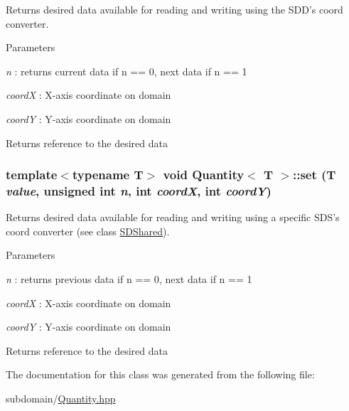 Returns desired data available for reading and writing using the SDD's coord converter. 
\begin{DoxyParams}{Parameters}
\item[{\em n}]: returns current data if n == 0, next data if n == 1 \item[{\em coordX}]: X-\/axis coordinate on domain \item[{\em coordY}]: Y-\/axis coordinate on domain\end{DoxyParams}
\begin{DoxyReturn}{Returns}
reference to the desired data 
\end{DoxyReturn}
\hypertarget{classQuantity_a10c68498d1dfe59535a6f07c0627c8d4}{
\subsubsection[{set}]{\setlength{\rightskip}{0pt plus 5cm}template$<$typename T$>$ void {\bf Quantity}$<$ T $>$::set (T {\em value}, \/  unsigned int {\em n}, \/  int {\em coordX}, \/  int {\em coordY})}}
\label{classQuantity_a10c68498d1dfe59535a6f07c0627c8d4}


Returns desired data available for reading and writing using a specific SDS's coord converter (see class \hyperlink{classSDShared}{SDShared}). 
\begin{DoxyParams}{Parameters}
\item[{\em n}]: returns previous data if n == 0, next data if n == 1 \item[{\em coordX}]: X-\/axis coordinate on domain \item[{\em coordY}]: Y-\/axis coordinate on domain\end{DoxyParams}
\begin{DoxyReturn}{Returns}
reference to the desired data 
\end{DoxyReturn}


The documentation for this class was generated from the following file:\begin{DoxyCompactItemize}
\item 
subdomain/\hyperlink{Quantity_8hpp}{Quantity.hpp}\end{DoxyCompactItemize}
